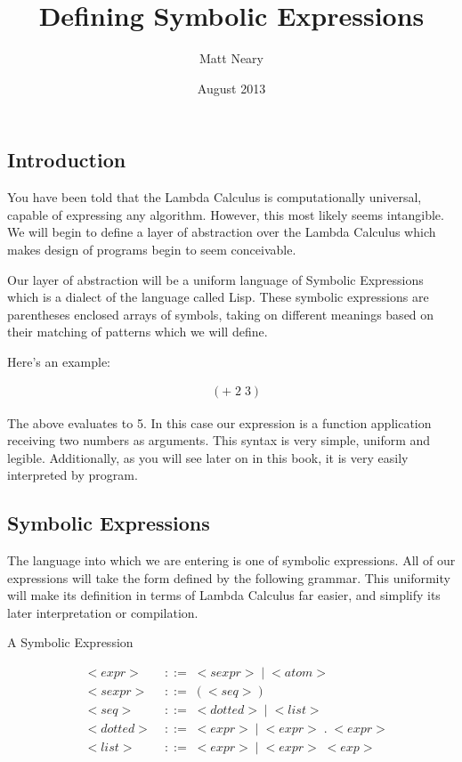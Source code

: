 \documentclass[11pt]{article}
\begin{document}
\begin{titlepage}
\title{Defining Symbolic Expressions}
\author{Matt Neary}
\date{August 2013}
\maketitle
\thispagestyle{empty}
\end{titlepage}
\subsection{Introduction}
You have been told that the Lambda Calculus is computationally universal, capable of expressing any algorithm. 
However, this most likely seems intangible. 
We will begin to define a layer of abstraction over the Lambda Calculus which makes design of programs begin to seem conceivable.

Our layer of abstraction will be a uniform language of Symbolic Expressions which is a dialect of the language called Lisp. 
These symbolic expressions are parentheses enclosed arrays of symbols, taking on different meanings based on their matching of patterns which we will define.

Here's an example:

\begin{align*}
& (+ \; 2 \; 3)
\end{align*}

The above evaluates to 5. In this case our expression is a function application receiving two numbers as arguments. This syntax is very simple, uniform and legible. Additionally, as you will see later on in this book, it is very easily interpreted by program.

\subsection{Symbolic Expressions}
The language into which we are entering is one of symbolic expressions. All of our expressions will take the form defined by the following grammar. This uniformity will make its definition in terms of Lambda Calculus far easier, and simplify its later interpretation or compilation.

A Symbolic Expression

\begin{align*}
& <expr> \; &::= \; <sexpr> \; | \; <atom>
\\& <sexpr> \; &::= \; (<seq>)
\\& <seq> \; &::= \; <dotted> \; | \; <list>
\\& <dotted> \; &::= \; <expr> \; | \; <expr> \; . \; <expr>
\\& <list> \; &::= \; <expr> \; | \; <expr> \; <exp>
\end{align*}
\end{document}
